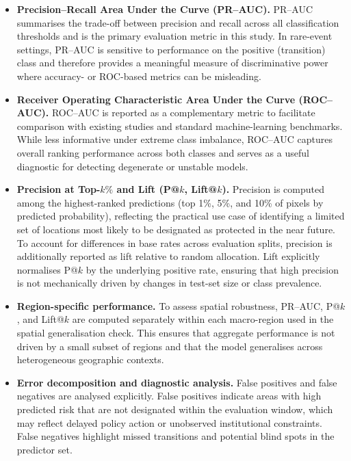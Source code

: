 \documentclass[12pt]{article}
\theoremstyle{break} %
\begin{document}
\begin{itemize}
    \item \textbf{Precision--Recall Area Under the Curve (PR--AUC).}  
    PR--AUC summarises the trade-off between precision and recall across all classification thresholds and is the primary evaluation metric in this study. In rare-event settings, PR--AUC is sensitive to performance on the positive (transition) class and therefore provides a meaningful measure of discriminative power where accuracy- or ROC-based metrics can be misleading.

    \item \textbf{Receiver Operating Characteristic Area Under the Curve (ROC--AUC).}  
    ROC--AUC is reported as a complementary metric to facilitate comparison with existing studies and standard machine-learning benchmarks. While less informative under extreme class imbalance, ROC--AUC captures overall ranking performance across both classes and serves as a useful diagnostic for detecting degenerate or unstable models.

    \item \textbf{Precision at Top-$k\%$ and Lift (P@$k$, Lift@$k$).}  
    Precision is computed among the highest-ranked predictions (top 1\%, 5\%, and 10\% of pixels by predicted probability), reflecting the practical use case of identifying a limited set of locations most likely to be designated as protected in the near future. To account for differences in base rates across evaluation splits, precision is additionally reported as lift relative to random allocation. Lift explicitly normalises P@$k$ by the underlying positive rate, ensuring that high precision is not mechanically driven by changes in test-set size or class prevalence.

    \item \textbf{Region-specific performance.}  
    To assess spatial robustness, PR--AUC, P@$k$, and Lift@$k$ are computed separately within each macro-region used in the spatial generalisation check. This ensures that aggregate performance is not driven by a small subset of regions and that the model generalises across heterogeneous geographic contexts.

    \item \textbf{Error decomposition and diagnostic analysis.}  
    False positives and false negatives are analysed explicitly. False positives indicate areas with high predicted risk that are not designated within the evaluation window, which may reflect delayed policy action or unobserved institutional constraints. False negatives highlight missed transitions and potential blind spots in the predictor set.
\end{itemize}
\end{document}
